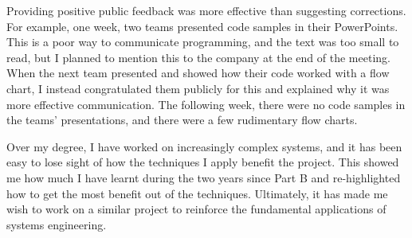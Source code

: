         Providing positive public feedback was more effective than suggesting corrections.
        For example, one week, two teams presented code samples in their PowerPoints.
        This is a poor way to communicate programming, and the text was too small to read, but I planned to mention this to the company at the end of the meeting.
        When the next team presented and showed how their code worked with a flow chart, I instead congratulated them publicly for this and explained why it was more effective communication.
        The following week, there were no code samples in the teams' presentations, and there were a few rudimentary flow charts.

        Over my degree, I have worked on increasingly complex systems, and it has been easy to lose sight of how the techniques I apply benefit the project.
        This showed me how much I have learnt during the two years since Part B and re-highlighted how to get the most benefit out of the techniques.
        Ultimately, it has made me wish to work on a similar project to reinforce the fundamental applications of systems engineering.
